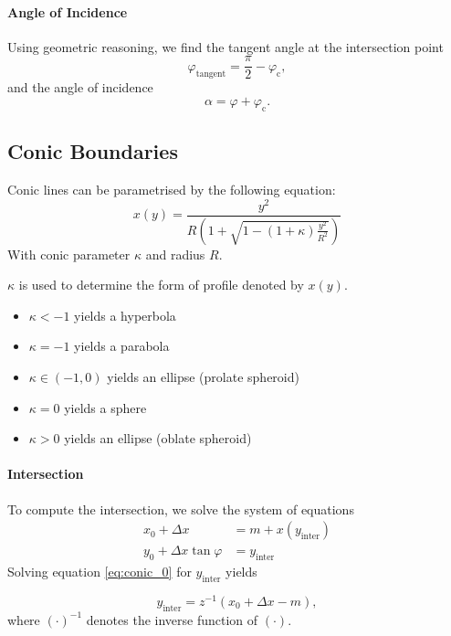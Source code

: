 \documentclass[12pt]{article}
\begin{document}
\paragraph{Angle of Incidence} Using geometric reasoning, we find the tangent angle at
the intersection point
$$\varphi_\text{tangent} = \frac{\pi}{2} - \varphi_\text{c},$$
and the angle of incidence
$$\alpha = \varphi + \varphi_\text{c}.$$

\clearpage
\subsection{Conic Boundaries}
Conic lines can be parametrised by the following equation:
\begin{equation}\label{eq:conic_parametr}
  x(y) = \frac{y^2}{R \left(1 + \sqrt{1 - (1 + \kappa) \frac{y^2}{R^2}}\right)}
\end{equation}
With conic parameter $\kappa$ and radius $R$.

$\kappa$ is used to determine the form of profile denoted by $x(y)$.
\begin{itemize}
  \item $\kappa < -1$ yields a hyperbola
  \item $\kappa = -1$ yields a parabola
  \item $\kappa \in (-1, 0)$ yields an ellipse (prolate spheroid)
  \item $\kappa = 0$ yields a sphere
  \item $\kappa > 0$ yields an ellipse (oblate spheroid)
\end{itemize}

\paragraph{Intersection} To compute the intersection, we solve the system of equations
\begin{align}
  \label{eq:conic_0} x_0 + \Delta x & = m + x(y_\text{inter})\\
  \label{eq:conic_1} y_0 + \Delta x \tan\varphi & = y_\text{inter}
\end{align}
Solving equation \eqref{eq:conic_0} for $y_\text{inter}$ yields

\begin{equation}\label{eq:conic_y_inter}
  y_\text{inter} = z^{-1} (x_0 + \Delta x - m),
\end{equation}
where $(\cdot)^{-1}$ denotes the inverse function of $(\cdot)$.
\end{document}

